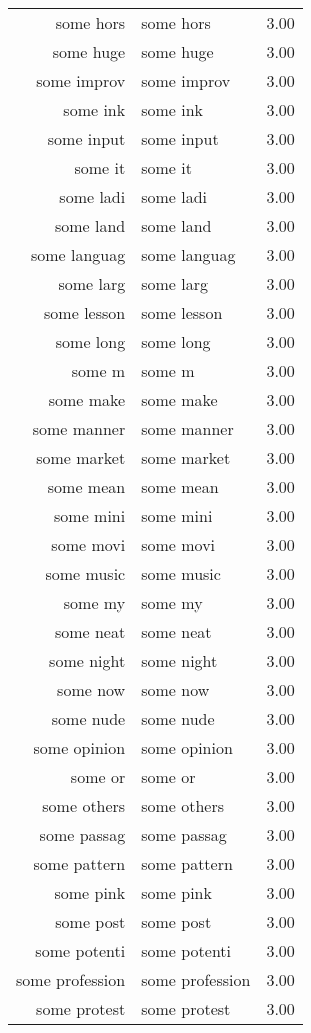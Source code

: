 \begin{table}[ht]
\begin{tabular}{rlr}
  some hors & some hors & 3.00 \\ 
  some huge & some huge & 3.00 \\ 
  some improv & some improv & 3.00 \\ 
  some ink & some ink & 3.00 \\ 
  some input & some input & 3.00 \\ 
  some it & some it & 3.00 \\ 
  some ladi & some ladi & 3.00 \\ 
  some land & some land & 3.00 \\ 
  some languag & some languag & 3.00 \\ 
  some larg & some larg & 3.00 \\ 
  some lesson & some lesson & 3.00 \\ 
  some long & some long & 3.00 \\ 
  some m & some m & 3.00 \\ 
  some make & some make & 3.00 \\ 
  some manner & some manner & 3.00 \\ 
  some market & some market & 3.00 \\ 
  some mean & some mean & 3.00 \\ 
  some mini & some mini & 3.00 \\ 
  some movi & some movi & 3.00 \\ 
  some music & some music & 3.00 \\ 
  some my & some my & 3.00 \\ 
  some neat & some neat & 3.00 \\ 
  some night & some night & 3.00 \\ 
  some now & some now & 3.00 \\ 
  some nude & some nude & 3.00 \\ 
  some opinion & some opinion & 3.00 \\ 
  some or & some or & 3.00 \\ 
  some others & some others & 3.00 \\ 
  some passag & some passag & 3.00 \\ 
  some pattern & some pattern & 3.00 \\ 
  some pink & some pink & 3.00 \\ 
  some post & some post & 3.00 \\ 
  some potenti & some potenti & 3.00 \\ 
  some profession & some profession & 3.00 \\ 
  some protest & some protest & 3.00 \\ 

\end{tabular}
\end{table}
